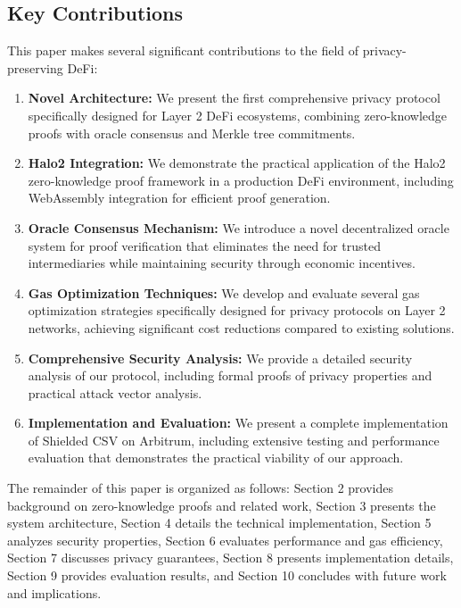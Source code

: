 \documentclass[11pt,a4paper]{article}
\begin{document}
\subsection{Key Contributions}

This paper makes several significant contributions to the field of privacy-preserving DeFi:

\begin{enumerate}
    \item \textbf{Novel Architecture:} We present the first comprehensive privacy protocol specifically designed for Layer 2 DeFi ecosystems, combining zero-knowledge proofs with oracle consensus and Merkle tree commitments.
    
    \item \textbf{Halo2 Integration:} We demonstrate the practical application of the Halo2 zero-knowledge proof framework in a production DeFi environment, including WebAssembly integration for efficient proof generation.
    
    \item \textbf{Oracle Consensus Mechanism:} We introduce a novel decentralized oracle system for proof verification that eliminates the need for trusted intermediaries while maintaining security through economic incentives.
    
    \item \textbf{Gas Optimization Techniques:} We develop and evaluate several gas optimization strategies specifically designed for privacy protocols on Layer 2 networks, achieving significant cost reductions compared to existing solutions.
    
    \item \textbf{Comprehensive Security Analysis:} We provide a detailed security analysis of our protocol, including formal proofs of privacy properties and practical attack vector analysis.
    
    \item \textbf{Implementation and Evaluation:} We present a complete implementation of Shielded CSV on Arbitrum, including extensive testing and performance evaluation that demonstrates the practical viability of our approach.
\end{enumerate}

The remainder of this paper is organized as follows: Section 2 provides background on zero-knowledge proofs and related work, Section 3 presents the system architecture, Section 4 details the technical implementation, Section 5 analyzes security properties, Section 6 evaluates performance and gas efficiency, Section 7 discusses privacy guarantees, Section 8 presents implementation details, Section 9 provides evaluation results, and Section 10 concludes with future work and implications.
\end{document}
